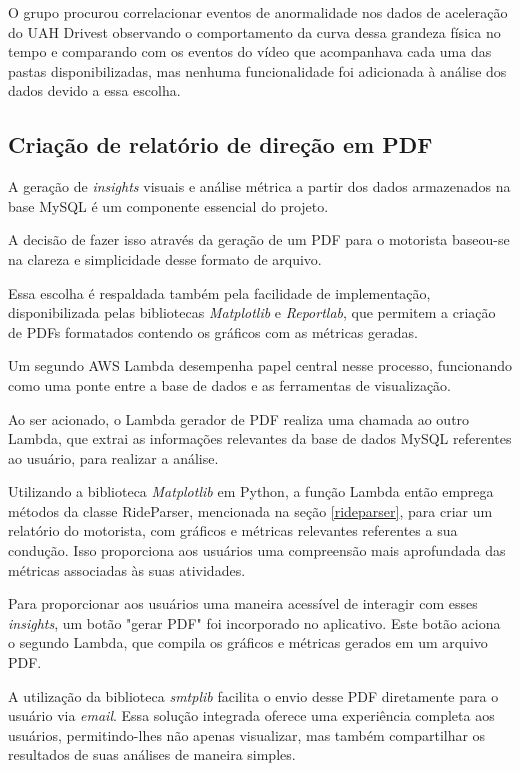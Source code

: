     O grupo procurou correlacionar eventos de anormalidade nos dados de aceleração do UAH Drivest observando o comportamento da curva dessa grandeza física no tempo e comparando com os eventos do vídeo que acompanhava cada uma das pastas disponibilizadas, mas nenhuma funcionalidade foi adicionada à análise dos dados devido a essa escolha.
    


    \subsection{Criação de relatório de direção em PDF}
    
    A geração de \textit{insights} visuais e análise métrica a partir dos dados armazenados na base MySQL é um componente essencial do projeto. 
    
    A decisão de fazer isso através da geração de um PDF para o motorista baseou-se na clareza e simplicidade desse formato de arquivo. 
    
    Essa escolha é respaldada também pela facilidade de implementação, disponibilizada pelas bibliotecas \textit{Matplotlib} e \textit{Reportlab}, que permitem a criação de PDFs formatados contendo os gráficos com as métricas geradas.
    
    Um segundo AWS Lambda desempenha papel central nesse processo, funcionando como uma ponte entre a base de dados e as ferramentas de visualização. 
    
    Ao ser acionado, o Lambda gerador de PDF realiza uma chamada ao outro Lambda, que extrai as informações relevantes da base de dados MySQL referentes ao usuário, para realizar a análise.

    Utilizando a biblioteca \textit{Matplotlib} em Python, a função Lambda então emprega métodos da classe RideParser, mencionada na seção \ref{rideparser}, para criar um relatório do motorista, com gráficos e métricas relevantes referentes a sua condução. Isso proporciona aos usuários uma compreensão mais aprofundada das métricas associadas às suas atividades.
    
    Para proporcionar aos usuários uma maneira acessível de interagir com esses \textit{insights}, um botão "gerar PDF" foi incorporado no aplicativo. Este botão aciona o segundo Lambda, que compila os gráficos e métricas gerados em um arquivo PDF. 
    
    A utilização da biblioteca \textit{smtplib} facilita o envio desse PDF diretamente para o usuário via \textit{email}. Essa solução integrada oferece uma experiência completa aos usuários, permitindo-lhes não apenas visualizar, mas também compartilhar os resultados de suas análises de maneira simples.    

